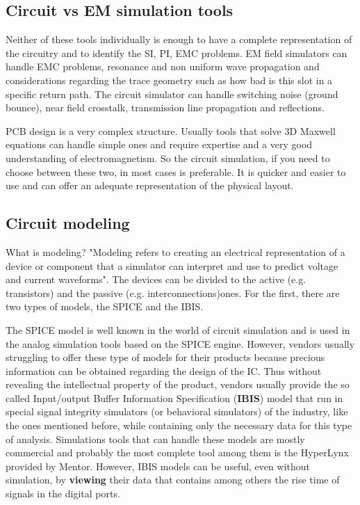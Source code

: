\documentclass[final]{cubedoc}
\begin{document}
	\subsection{Circuit vs EM simulation tools}
	
	Neither of these tools individually is enough to have a complete representation of the circuitry and to identify the SI, PI, EMC problems. EM field simulators can handle EMC problems, resonance and non uniform wave propagation and considerations regarding the trace geometry such as how bad is this slot in a specific return path. The circuit simulator can handle switching noise (ground bounce), near field crosstalk, transmission line propagation and reflections.	
	
	PCB design is a very complex structure. Usually tools that solve 3D Maxwell equations can handle simple ones and require expertise and a very good understanding of electromagnetism. So the circuit simulation, if you need to choose between these two, in most cases is preferable. It is quicker and easier to use and can offer an adequate representation of the physical layout.
	
	\subsection{Circuit modeling}
	
	
	What is modeling? "Modeling refers to creating an electrical representation of a device or component that a simulator can interpret and use to predict voltage and current waveforms". The devices can be divided to the active (e.g. transistors) and the passive (e.g. interconnections)ones. For the first, there are two types of models, the SPICE and the IBIS.
	
	The SPICE model is well known in the world of circuit simulation and is used in the analog simulation tools based on the SPICE engine. However, vendors usually struggling to offer these type of models for their products because precious information can be obtained regarding the design of the IC. Thus without revealing the intellectual property of the product, vendors usually provide the so called Input/output Buffer Information Specification (\textbf{IBIS}) model that run in special signal integrity simulators (or behavioral simulators) of the industry, like the ones mentioned before, while containing only the necessary data for this type of analysis. Simulations tools that can handle these models are mostly commercial and probably the most complete tool among them is the HyperLynx provided by Mentor.
	However, IBIS models can be useful, even without simulation, by \textbf{viewing} their data that contains among others the rise time of signals in the digital ports.
	
\end{document}
